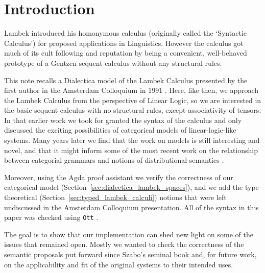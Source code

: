\documentclass{lmcs}
\begin{document}
\section*{Introduction}
Lambek introduced his homonymous calculus (originally called the
`Syntactic Calculus') for proposed applications in Linguistics.
However the calculus got much of its cult following and reputation by
being a convenient, well-behaved prototype of a Gentzen sequent
calculus without any structural rules.

This note recalls a Dialectica model of the Lambek Calculus presented
by the first author in the Amsterdam Colloquium in 1991
\cite{depaiva1991}. Here, like then, we approach the Lambek Calculus
from the perspective of Linear Logic, so we are interested in the
basic sequent calculus with no structural rules, except associativity
of tensors. In that earlier work we took for granted the syntax of the
calculus and only discussed the exciting possibilities of categorical
models of linear-logic-like systems.  Many years later we find that
the work on models is still interesting and novel, and that it might
inform some of the most recent work on the relationship between
categorial grammars and notions of distributional semantics
\cite{coecke2013}.


Moreover, using the Agda proof assistant \cite{bove2009} we verify the
correctness of our categorical model
(Section~\ref{sec:dialectica_lambek_spaces}), and we add the type
theoretical (Section~\ref{sec:typed_lambek_calculi}) notions that were
left undiscussed in the Amsterdam Colloquium presentation.  All of the
syntax in this paper was checked using \texttt{Ott}
\cite{Sewell:2010}.

The goal is to show that our implementation can shed new light on some
of the issues that remained open.  Mostly we wanted to check the
correctness of the semantic proposals put forward since Szabo's
seminal book \cite{szabo1978} and, for future work, on the
applicability and fit of the original systems to their intended uses.
\end{document}
